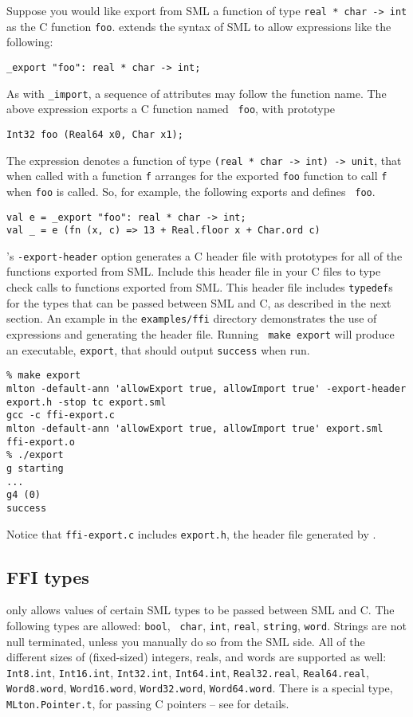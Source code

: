 Suppose you would like export from SML a function of type {\tt real *
char -> int} as the C function {\tt foo}.  {\mlton} extends the syntax
of SML to allow expressions like the following:
\begin{verbatim}
_export "foo": real * char -> int;
\end{verbatim}
As with {\tt \_import}, a sequence of attributes may follow the
function name.  The above expression exports a C function named {\tt
foo}, with prototype
\begin{verbatim}
Int32 foo (Real64 x0, Char x1);
\end{verbatim}
The {\export} expression denotes a function of type {\tt (real * char
-> int) -> unit}, that when called with a function {\tt f} arranges
for the exported {\tt foo} function to call {\tt f} when {\tt foo} is
called.  So, for example, the following exports and defines {\tt
foo}.
\begin{verbatim}
val e = _export "foo": real * char -> int;
val _ = e (fn (x, c) => 13 + Real.floor x + Char.ord c)
\end{verbatim}

{\mlton}'s {\tt -export-header} option generates a C header file with
prototypes for all of the functions exported from SML.  Include this
header file in your C files to type check calls to functions exported
from SML.  This header file includes {\tt typedef}s for the types that
can be passed between SML and C, as described in the next section.  An
example in the {\tt examples/ffi} directory demonstrates the use of
{\export} expressions and generating the header file.  Running {\tt
make export} will produce an executable, {\tt export}, that should
output {\tt success} when run.

\begin{verbatim}
% make export
mlton -default-ann 'allowExport true, allowImport true' -export-header export.h -stop tc export.sml
gcc -c ffi-export.c
mlton -default-ann 'allowExport true, allowImport true' export.sml ffi-export.o
% ./export
g starting
...
g4 (0)
success
\end{verbatim}
%
Notice that {\tt ffi-export.c} includes {\tt export.h}, the header
file generated by {\mlton}.
%
\subsection{FFI types}

{\mlton} only allows values of certain SML types to be passed
between SML and C.  The following types are allowed: {\tt bool}, {\tt
char}, {\tt int}, {\tt real}, {\tt string}, {\tt word}.  Strings are
not null terminated, unless you manually do so from the SML side.  All
of the different sizes of (fixed-sized) integers, reals, and words are
supported as well: {\tt Int8.int}, {\tt Int16.int}, {\tt Int32.int},
{\tt Int64.int}, {\tt Real32.real}, {\tt Real64.real}, {\tt
Word8.word}, {\tt Word16.word}, {\tt Word32.word}, {\tt Word64.word}.
There is a special type, {\tt MLton.Pointer.t}, for passing C pointers
-- see  for details.

